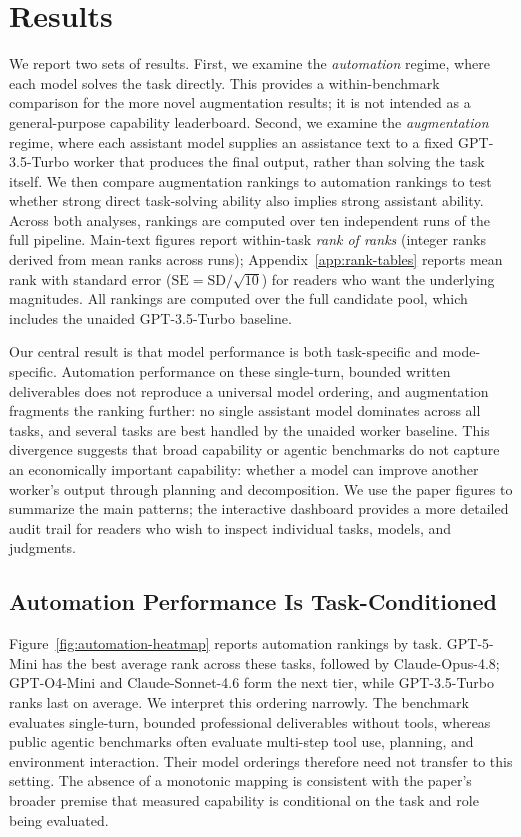 \section{Results}

We report two sets of results. First, we examine the \emph{automation} regime,
where each model solves the task directly. This provides a within-benchmark
comparison for the more novel augmentation results; it is not intended as a
general-purpose capability leaderboard. Second, we examine the
\emph{augmentation} regime, where each assistant model supplies an assistance
text to a fixed GPT-3.5-Turbo worker that produces the final output, rather than
solving the task itself. We then compare augmentation rankings to automation
rankings to test whether strong direct task-solving ability also implies strong
assistant ability. Across both analyses, rankings are computed over ten
independent runs of the full pipeline. Main-text figures report within-task
\emph{rank of ranks} (integer ranks derived from mean ranks across runs);
Appendix~\ref{app:rank-tables} reports mean rank with standard error
($\mathrm{SE}=\mathrm{SD}/\sqrt{10}$) for readers who want the underlying
magnitudes. All rankings are computed over the full candidate pool, which
includes the unaided GPT-3.5-Turbo baseline.

Our central result is that model performance is both task-specific and
mode-specific. Automation performance on these single-turn, bounded written
deliverables does not reproduce a universal model ordering, and augmentation
fragments the ranking further: no single assistant model dominates across all
tasks, and several tasks are best handled by the unaided worker baseline. This
divergence suggests that broad capability or agentic benchmarks do not capture
an economically important capability: whether a model can improve another
worker's output through planning and decomposition. We use the paper figures
to summarize the main patterns; the interactive dashboard provides a more
detailed audit trail for readers who wish to inspect individual tasks, models,
and judgments.

\subsection{Automation Performance Is Task-Conditioned}

Figure~\ref{fig:automation-heatmap} reports automation rankings by task.
GPT-5-Mini has the best average rank across these tasks, followed by
Claude-Opus-4.8; GPT-O4-Mini and Claude-Sonnet-4.6 form the next tier, while
GPT-3.5-Turbo ranks last on average. We interpret this ordering narrowly. The
benchmark evaluates single-turn, bounded professional deliverables without
tools, whereas public agentic benchmarks often evaluate multi-step tool use,
planning, and environment interaction. Their model orderings therefore need
not transfer to this setting. The absence of a monotonic mapping is consistent
with the paper's broader premise that measured capability is conditional on the
task and role being evaluated.


